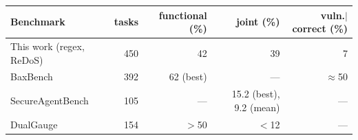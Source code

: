 \begin{tabular}{lrrrr}
\toprule
Benchmark & tasks & functional (\%) & joint (\%) & vuln.$\mid$correct (\%) \\
\midrule
This work (regex, ReDoS) & 450 & 42 & 39 & 7 \\
BaxBench \citep{vero2025baxbench} & 392 & 62 (best) & --- & $\approx$50 \\
SecureAgentBench \citep{chen2025secureagentbench} & 105 & --- & 15.2 (best), 9.2 (mean) & --- \\
DualGauge \citep{patir2025dualgauge} & 154 & $>$50 & $<$12 & --- \\
\bottomrule
\end{tabular}
